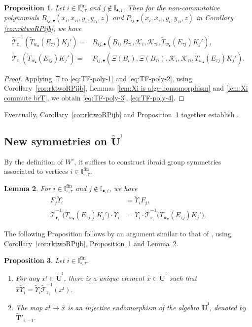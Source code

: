 \documentclass[a4paper,reqno,12pt]{amsart}
\numberwithin{equation}{section}
\newtheorem{proposition}{Proposition}[section]
\newtheorem{lemma}[proposition]{Lemma}
\theoremstyle{definition}
\theoremstyle{plain}
\theoremstyle{definition}
\def\I{\mathbb I}
\def\bIi{\I_{\bullet,i}}
\def\bw{w_\bullet}
\def\br{\mathbf r}
\def\tUi{\widetilde{\mathbf U}^{\imath}}
\def\tTD{\widetilde T}
\def\tT{\widetilde{\mathscr T}}
\def\tTT{\widetilde{\mathbf T}}
\def\tfX{\widetilde\Upsilon}
\def\cK{\mathcal K}
\def \wItau{\I_{\circ,\tau}}
\def \fwItau{\wItau^{\mathrm{fin}}}
\newcommand{\tTa}[1]{\tTT'_{#1,-1}}
\begin{document}
\begin{proposition}
  \label{prop:rktwoRPijb}
Let $i\in\fwItau$ and $j\notin \bIi$. Then for the non-commutative polynomials $R_{ij,\bullet}(x_i,x_{\tau i}, y_i, y_{\tau i}, z)$ and $P_{ij,\bullet}(x_i, x_{\tau i}, y_i, y_{\tau i}, z)$ in Corollary \ref{cor:rktwoRPijb}, we have
\begin{align}
  \tT_{\br_i}^{-1} (\tTD_{\bw}( E_{\tau j}) K_j') =& R_{ij,\bullet}(B_i, B_{\tau i}, \cK_i, \cK_{\tau i}, \tTD_{\bw}( E_{\tau j}) K_j'),\label{eq:TF-poly-3}\\
  \tT_{\br_i} (\tTD_{\bw}( E_{\tau j}) K_j') =& P_{ij,\bullet}(\Xi(B_i), \Xi(B_{\tau i}), \cK_i, \cK_{\tau i}, \tTD_{\bw}( E_{\tau j}) K_j')\label{eq:TF-poly-4}.
\end{align}  
\end{proposition}
\begin{proof}
 Applying $\Xi$ to \eqref{eq:TF-poly-1} and \eqref{eq:TF-poly-2},  using Corollary~\ref{cor:rktwoRPijb}, Lemmas \ref{lem:Xi is alge-homomorphism} and \ref{lem:Xi commute brT}, we obtain \eqref{eq:TF-poly-3}, \eqref{eq:TF-poly-4}. 
\end{proof}
Eventually, Corollary~\ref{cor:rktwoRPijb} and Proposition~\ref{prop:rktwoRPijb} together establish \cite[Conjecture 5.13]{WZ23}. 


\subsection{New symmetries on $\tUi$}
By the definition of $W^\circ$, it suffices to construct ibraid group symmetries associated to vertices $i\in\fwItau$.
\begin{lemma}\cite[Lemma 5.1]{WZ23}
  \label{lem:rktwo1}
For $i\in\fwItau$ and $j\notin \bIi$, we have
\begin{align}
 F_j  \tfX_i &=\tfX_i  F_j,
 \label{eq:FjUp}\\
\tT_{\br_i}^{-1}\big(\tTD_{\bw}(E_{\tau j})K_j'\big)  \cdot \tfX_i
&= \tfX_i \cdot  \tT_{\br_i}^{-1}\big(\tTD_{\bw}(E_{\tau j}) K_j'\big).
 \label{eq:TEjUp}
\end{align}
\end{lemma}
The following Proposition follows by an argument similar to that of \cite[Theorem 4.7]{WZ23}, using Corollary~\ref{cor:rktwoRPijb}, Proposition~\ref{prop:rktwoRPijb} and Lemma~\ref{lem:rktwo1}.
\begin{proposition}
    \label{prop:newb0}
Let $i\in\fwItau$.
\begin{enumerate}
\item
For any $x^\imath \in \tUi$, there is a unique element $\hat x \in \tUi$ such that $\hat x \tfX_i =\tfX_i \tT_{\br_i}^{-1}(x^\imath)$.
\item
The map $x^\imath \mapsto \hat x$ is an injective endomorphism of the algebra $\tUi$, denoted by $\tTa{i}$.
\end{enumerate}
\end{proposition}
\end{document}
